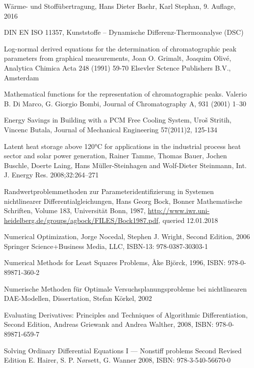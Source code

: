 \documentclass{scrartcl}[12pt, halfparskip]
\numberwithin{equation}{section}
\numberwithin{figure}{section}
\numberwithin{table}{section}
\begin{document}
\begin{thebibliography}{9}
	Wärme- und Stoffübertragung,
	Hans Dieter Baehr, Karl Stephan,
	9. Auflage, 2016
	
	DIN EN ISO 11357, 
	Kunststoffe –
	Dynamische Differenz-Thermoanalyse (DSC)
	
	Log-normal derived equations for the determination
	of chromatographic peak parameters
	from graphical measurements,
	Joan O. Grimalt, Joaquim Olivé,
	Analytica Chimica Acta 248 (1991) 59-70
	Elsevler Sctence Publishers B.V., Amsterdam
	
	Mathematical functions for the representation of chromatographic
	peaks.
	Valerio B. Di Marco, G. Giorgio Bombi,
	Journal of Chromatography A, 931 (2001) 1–30
	
	Energy Savings in Building with a PCM Free Cooling System,
	Uroš Stritih, Vincenc Butala,
	Journal of Mechanical Engineering 57(2011)2, 125-134	
	
	Latent heat storage above 120°C for applications in the industrial process heat sector and solar power generation,
	Rainer Tamme, Thomas Bauer, Jochen Buschle, Doerte Laing, Hans Müller-Steinhagen and Wolf-Dieter Steinmann,
	Int. J. Energy Res. 2008;32:264–271
	
	Randwertproblemmethoden zur Parameteridentifizierung in Systemen nichtlinearer Differentialgleichungen,
	Hans Georg Bock,
	Bonner Mathematische Schriften, Volume 183, Universität Bonn, 1987,
	\url{http://www.iwr.uni-heidelberg.de/groups/agbock/FILES/Bock1987.pdf}, queried 12.01.2018
	
	Numerical Optimization,
	Jorge Nocedal, Stephen J. Wright,
	Second Edition, 2006 Springer Science+Business Media, LLC, ISBN-13: 978-0387-30303-1
	
	Numerical Methods for Least Squares Problems,
	Åke Björck, 1996,
	ISBN: 978-0-89871-360-2
	
	Numerische Methoden
	für Optimale Versuchsplanungsprobleme
	bei nichtlinearen DAE-Modellen,
	Dissertation, Stefan Körkel, 2002
	
	Evaluating Derivatives: Principles and Techniques of Algorithmic Differentiation, Second Edition,
	Andreas Griewank and Andrea Walther, 2008,
	ISBN: 978-0-89871-659-7


	Solving Ordinary Differential Equations I --- Nonstiff problems
	Second Revised Edition
	E. Hairer, S. P. Nørsett, G. Wanner 
	2008, ISBN: 978-3-540-56670-0
	

\end{thebibliography}
\end{document}
